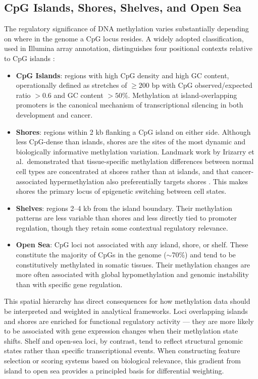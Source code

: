 \subsection{CpG Islands, Shores, Shelves, and Open Sea}

The regulatory significance of DNA methylation varies substantially depending
on where in the genome a CpG locus resides. A widely adopted classification,
used in Illumina array annotation, distinguishes four positional contexts
relative to CpG islands \cite{Irizarry2009}:

\begin{itemize}[label=-]
    \item \textbf{CpG Islands}: regions with high CpG density and high
    GC content, operationally defined as stretches of $\geq 200$ bp with
    CpG observed/expected ratio $> 0.6$ and GC content $> 50\%$.
    Methylation at island-overlapping promoters is the canonical mechanism
    of transcriptional silencing in both development and cancer.

    \item \textbf{Shores}: regions within 2 kb flanking a CpG island on
    either side. Although less CpG-dense than islands, shores are the sites
    of the most dynamic and biologically informative methylation variation.
    Landmark work by Irizarry et al.\ demonstrated that tissue-specific
    methylation differences between normal cell types are concentrated at
    shores rather than at islands, and that cancer-associated hypermethylation
    also preferentially targets shores \cite{Irizarry2009}. This makes shores
    the primary locus of epigenetic switching between cell states.

    \item \textbf{Shelves}: regions 2–4 kb from the island boundary. Their
    methylation patterns are less variable than shores and less directly tied
    to promoter regulation, though they retain some contextual regulatory
    relevance.

    \item \textbf{Open Sea}: CpG loci not associated with any island, shore,
    or shelf. These constitute the majority of CpGs in the genome ($\sim$70\%)
    and tend to be constitutively methylated in somatic tissues. Their
    methylation changes are more often associated with global hypomethylation
    and genomic instability than with specific gene regulation.
\end{itemize}

This spatial hierarchy has direct consequences for how methylation data
should be interpreted and weighted in analytical frameworks. Loci overlapping
islands and shores are enriched for functional regulatory activity — they are
more likely to be associated with gene expression changes when their methylation
state shifts. Shelf and open-sea loci, by contrast, tend to reflect structural
genomic states rather than specific transcriptional events. When constructing
feature selection or scoring systems based on biological relevance, this gradient
from island to open sea provides a principled basis for differential weighting.


